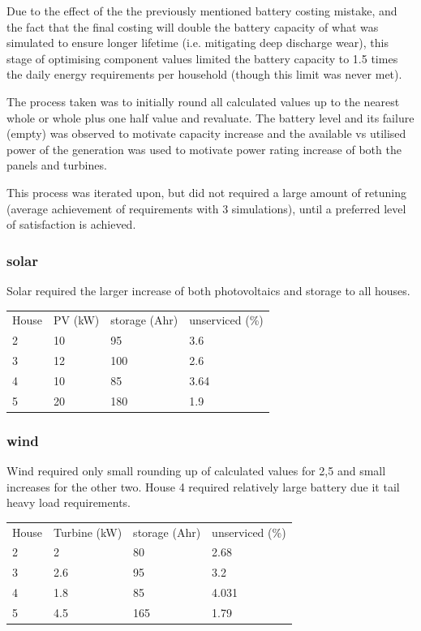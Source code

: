 \documentclass[journal]{IEEEtran}
\begin{document}
        Due to the effect of the the previously mentioned battery costing mistake, and the fact that the final costing will double the battery capacity of what was simulated to ensure longer lifetime (i.e. mitigating deep discharge wear), this stage of optimising component values limited the battery capacity to 1.5 times the daily energy requirements per household (though this limit was never met).

        The process taken was to initially round all calculated values up to the nearest whole or whole plus one half value and revaluate. The battery level and its failure (empty) was observed to motivate capacity increase and the available vs utilised power of the generation was used to motivate power rating increase of both the panels and turbines. 

        This process was iterated upon, but did not required a large amount of retuning (average achievement of requirements with 3 simulations), until a preferred level of satisfaction is achieved.  
        \subsubsection*{solar}
        Solar required the larger increase of both photovoltaics and storage to all houses.
        \begin{table}[h!]
                \begin{tabular}{llll}
                House & PV (kW) & storage (Ahr) & unserviced (\%) \\
                2     & 10      & 95            & 3.6             \\
                3     & 12      & 100           & 2.6             \\
                4     & 10      & 85            & 3.64            \\
                5     & 20      & 180           & 1.9            
                \end{tabular}
                \end{table}
        \subsubsection*{wind}
        Wind required only small rounding up of calculated values for 2,5 and small increases for the other two. House 4 required relatively large battery due it tail heavy load requirements.
        \begin{table}[h!]
                \begin{tabular}{llll}
                House & Turbine (kW) & storage (Ahr) & unserviced (\%) \\
                2     & 2            & 80            & 2.68            \\
                3     & 2.6          & 95            & 3.2             \\
                4     & 1.8          & 85            & 4.031           \\
                5     & 4.5          & 165           & 1.79           
                \end{tabular}
                \end{table}
\end{document}
